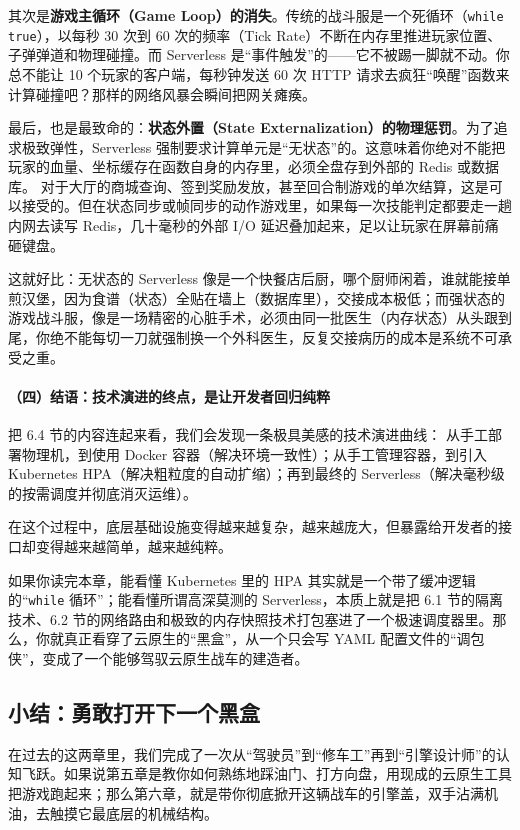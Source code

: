 其次是\textbf{游戏主循环（Game Loop）的消失}。传统的战斗服是一个死循环（\texttt{while true}），以每秒 30 次到 60 次的频率（Tick Rate）不断在内存里推进玩家位置、子弹弹道和物理碰撞。而 Serverless 是“事件触发”的——它不被踢一脚就不动。你总不能让 10 个玩家的客户端，每秒钟发送 60 次 HTTP 请求去疯狂“唤醒”函数来计算碰撞吧？那样的网络风暴会瞬间把网关瘫痪。

最后，也是最致命的：\textbf{状态外置（State Externalization）的物理惩罚}。为了追求极致弹性，Serverless 强制要求计算单元是“无状态”的。这意味着你绝对不能把玩家的血量、坐标缓存在函数自身的内存里，必须全盘存到外部的 Redis 或数据库。
对于大厅的商城查询、签到奖励发放，甚至回合制游戏的单次结算，这是可以接受的。但在状态同步或帧同步的动作游戏里，如果每一次技能判定都要走一趟内网去读写 Redis，几十毫秒的外部 I/O 延迟叠加起来，足以让玩家在屏幕前痛砸键盘。

这就好比：无状态的 Serverless 像是一个快餐店后厨，哪个厨师闲着，谁就能接单煎汉堡，因为食谱（状态）全贴在墙上（数据库里），交接成本极低；而强状态的游戏战斗服，像是一场精密的心脏手术，必须由同一批医生（内存状态）从头跟到尾，你绝不能每切一刀就强制换一个外科医生，反复交接病历的成本是系统不可承受之重。

\paragraph{（四）结语：技术演进的终点，是让开发者回归纯粹}

把 6.4 节的内容连起来看，我们会发现一条极具美感的技术演进曲线：
从手工部署物理机，到使用 Docker 容器（解决环境一致性）；从手工管理容器，到引入 Kubernetes HPA（解决粗粒度的自动扩缩）；再到最终的 Serverless（解决毫秒级的按需调度并彻底消灭运维）。

在这个过程中，底层基础设施变得越来越复杂，越来越庞大，但暴露给开发者的接口却变得越来越简单，越来越纯粹。

如果你读完本章，能看懂 Kubernetes 里的 HPA 其实就是一个带了缓冲逻辑的“\texttt{while} 循环”；能看懂所谓高深莫测的 Serverless，本质上就是把 6.1 节的隔离技术、6.2 节的网络路由和极致的内存快照技术打包塞进了一个极速调度器里。那么，你就真正看穿了云原生的“黑盒”，从一个只会写 YAML 配置文件的“调包侠”，变成了一个能够驾驭云原生战车的建造者。

\subsection{小结：勇敢打开下一个黑盒}

在过去的这两章里，我们完成了一次从“驾驶员”到“修车工”再到“引擎设计师”的认知飞跃。如果说第五章是教你如何熟练地踩油门、打方向盘，用现成的云原生工具把游戏跑起来；那么第六章，就是带你彻底掀开这辆战车的引擎盖，双手沾满机油，去触摸它最底层的机械结构。

